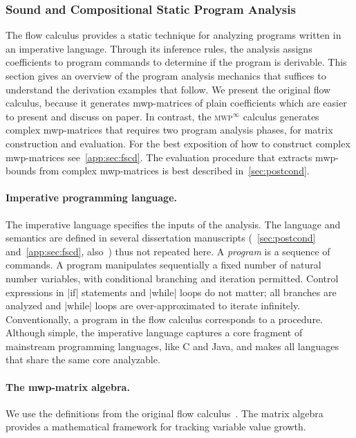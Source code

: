 \subsubsection{Sound and Compositional Static Program Analysis}\label{mwp-analysis}

The flow calculus provides a static technique for analyzing programs written in an imperative language.
Through its inference rules, the analysis assigns coefficients to program commands to determine if the program is derivable.
This section gives an overview of the program analysis mechanics that suffices to understand the derivation examples that follow.
We present the original flow calculus, because it generates mwp-matrices of plain coefficients which are easier to present and discuss on paper.
In contrast, the \textsc{mwp}\(^\infty\) calculus generates complex mwp-matrices that requires two program analysis phases, for matrix construction and evaluation.
For the best exposition of how to construct complex mwp-matrices see~\autoref{app:sec:fscd}.
The evaluation procedure that extracts mwp-bounds from complex mwp-matrices is best described in~\autoref{sec:postcond}.

\paragraph*{Imperative programming language.}
The imperative language specifies the inputs of the analysis.
The language and semantics are defined in several dissertation manuscripts (\cf~\autoref{sec:postcond} and~\autoref{app:sec:fscd}, also~\cite[p. 4]{jones2009}) thus not repeated here.
A \emph{program} is a sequence of commands.
A program manipulates sequentially a fixed number of natural number variables,
with conditional branching and iteration permitted.
Control expressions in \pr|if| statements and \pr|while| loops do not matter;
all branches are analyzed and \pr|while| loops are over-approximated to iterate infinitely.
Conventionally, a program in the flow calculus corresponds to a procedure.
Although simple, the imperative language captures a core fragment of mainstream programming languages, like C and Java, and makes all languages that share the same core analyzable.

\paragraph*{The mwp-matrix algebra.}
We use the definitions from the original flow calculus~\cite{jones2009}.
The matrix algebra provides a mathematical framework for tracking variable value growth.

